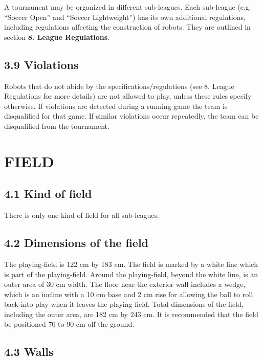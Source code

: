 \documentclass{article}
\begin{document}
A tournament may be organized in different sub-leagues. Each sub-league (e.g. ``\textcolor{color-5}{Soccer Open}'' and ``\textcolor{color-5}{Soccer Lightweight}'') \textcolor{color-5}{has} its own additional regulations, including regulations affecting the construction of robots. \textcolor{color-5}{They are outlined in section} \textbf{\textcolor{color-5}{8. League Regulations}}\textcolor{color-5}{.}

\subsection{3.9 Violations \label{ref-027}}

Robots that do not abide by the specifications/regulations \textcolor{color-5}{(see 8. League Regulations for more details)} are not allowed to play, \textcolor{color-5}{unless these rules specify otherwise}. If violations are detected during a running game the team is disqualified for that game. If similar violations occur repeatedly, the team can be disqualified from the tournament. 

\section{FIELD \label{ref-028}}

\subsection{4.1 Kind of field \label{ref-029}}

There is only one kind of field for all sub-leagues. 

\subsection{4.2 Dimensions of the field \label{ref-030}}

The playing-field is 122 cm by 183 cm. The field is marked by a white line which is part of the playing-field. Around the playing-field, beyond the white line, is an outer area of 30 cm width. The floor near the exterior wall includes a wedge, which is an incline with a 10 cm base and \textcolor{color-5}{2} cm rise for allowing the ball to roll back into play when it leaves the playing field. Total dimensions of the field, including the outer area, are 182 cm by 243 cm. It is recommended that the field be positioned 70 to 90 cm off the ground. 

\subsection{4.3 Walls \label{ref-031}}
\end{document}
